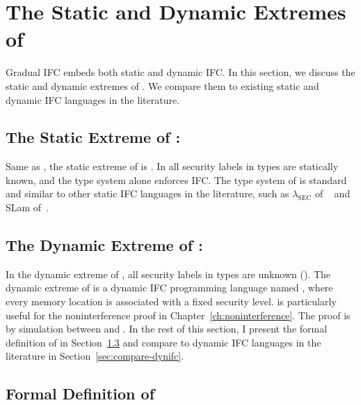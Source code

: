 \section{The Static and Dynamic Extremes of \Surface}
\label{sec:embedding}

{\color{NavyBlue}  %
Gradual IFC embeds both static and dynamic IFC. In this section, we discuss the
static and dynamic extremes of \Surface. We compare them to existing static and
dynamic IFC languages in the literature.

\subsection{The Static Extreme of \Surface: \SSLRef}

Same as \GSLRef, the static extreme of \Surface is \SSLRef. In \SSLRef all
security labels in types are statically known, and the type system alone
enforces IFC. The type system of \SSLRef is standard and similar to other static
IFC languages in the literature, such as $\lambda_{\text{SEC}}$ of
~\textcite{zdancewic2002programming} and SLam of~\textcite{heintze1998slam}.

\subsection{The Dynamic Extreme of \Surface: \DynIFC}

In the dynamic extreme of \GSLRef, all security labels in types are unknown
(\unk). The dynamic extreme of \GSLRef is a dynamic IFC programming language
named \DynIFC, where every memory location is associated with a fixed security
level. \DynIFC is particularly useful for the noninterference proof in
Chapter~\ref{ch:noninterference}. The proof is by simulation between \CC and
\DynIFC. In the rest of this section, I present the formal definition of \DynIFC
in Section~\ref{sec:def-dynifc} and compare \DynIFC to dynamic IFC languages in
the literature in Section~\ref{sec:compare-dynifc}.

\subsection{Formal Definition of \DynIFC}
\label{sec:def-dynifc}

}
